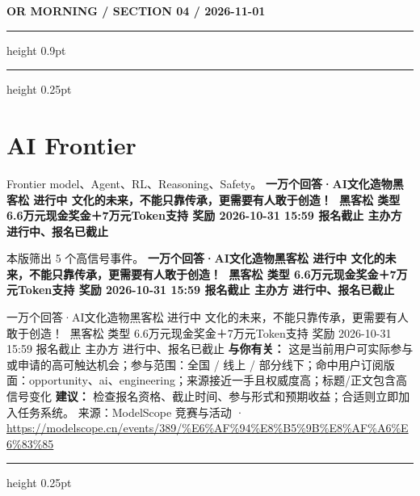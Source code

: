 \documentclass[10.5pt]{ctexart}
\begin{document}
\newpage
{\small\bfseries OR MORNING / SECTION 04 / 2026-11-01}
\vspace{2mm}
\hrule height 0.9pt
\vspace{1.5mm}
\hrule height 0.25pt
\vspace{4mm}
\section*{AI Frontier}
{\color{ormuted} Frontier model、Agent、RL、Reasoning、Safety。}
\vspace{2mm}
{\LARGE\bfseries 一万个回答·AI文化造物黑客松 进行中 文化的未来，不能只靠传承，更需要有人敢于创造！👋 黑客松 类型 6.6万元现金奖金＋7万元Token支持 奖励 2026-10-31 15:59 报名截止 主办方 进行中、报名已截止}\par
\vspace{1mm}
{\color{ormuted} 本版筛出 5 个高信号事件。}
\vspace{3mm}
{\Large\bfseries 一万个回答·AI文化造物黑客松 进行中 文化的未来，不能只靠传承，更需要有人敢于创造！👋 黑客松 类型 6.6万元现金奖金＋7万元Token支持 奖励 2026-10-31 15:59 报名截止 主办方 进行中、报名已截止}\par
一万个回答·AI文化造物黑客松 进行中 文化的未来，不能只靠传承，更需要有人敢于创造！👋 黑客松 类型 6.6万元现金奖金＋7万元Token支持 奖励 2026-10-31 15:59 报名截止 主办方 进行中、报名已截止
\textbf{与你有关：} 这是当前用户可实际参与或申请的高可触达机会；参与范围：全国 / 线上 / 部分线下；命中用户订阅版面：opportunity、ai、engineering；来源接近一手且权威度高；标题/正文包含高信号变化
\textbf{建议：} 检查报名资格、截止时间、参与形式和预期收益；合适则立即加入任务系统。
{\footnotesize\color{ormuted} 来源：ModelScope 竞赛与活动 · \url{https://modelscope.cn/events/389/%E6%AF%94%E8%B5%9B%E8%AF%A6%E6%83%85}}
\vspace{4mm}
\hrule height 0.25pt
\vspace{3mm}
\end{document}
